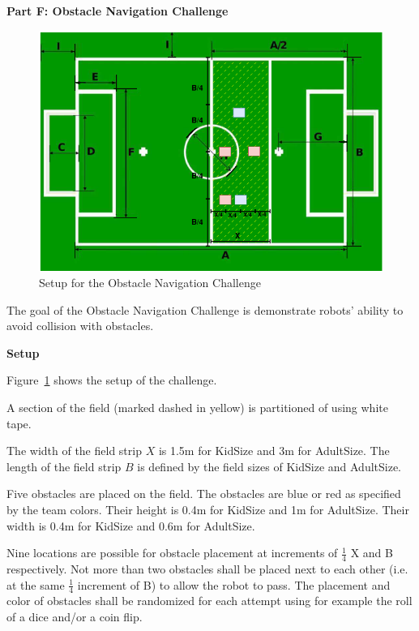 \clearpage
\sffamily
{\bfseries\color[rgb]{0.4,0.4,0.4} Part F: Obstacle Navigation Challenge}
{}

\bigskip

\begin{figure}[h!]
\centering
\includegraphics[width=\linewidth]{img/tcnavigation.png}
\caption{Setup for the Obstacle Navigation Challenge}
\label{fig:obs-nav}
\end{figure}

The goal of the Obstacle Navigation Challenge is demonstrate robots' ability to avoid collision with obstacles.

\vspace{2em}
{\bfseries Setup}

Figure~\ref{fig:obs-nav} shows the setup of the challenge.

A section of the field (marked dashed in yellow) is partitioned of using white tape.

The width of the field strip $X$ is 1.5m for KidSize and 3m for AdultSize. The length of the field strip $B$ is defined by the field sizes of KidSize and AdultSize.

Five obstacles are placed on the field. The obstacles are blue or red as specified by the team colors. Their height is 0.4m for KidSize and 1m for AdultSize. Their width is 0.4m for KidSize and 0.6m for AdultSize.

Nine locations are possible for obstacle placement at increments of $\frac{1}{4}$ X and B respectively. Not more than two obstacles shall be placed next to each other (i.e. at the same $\frac{1}{4}$ increment of B) to allow the robot to pass. The placement and color of obstacles shall be randomized for each attempt using for example the roll of a dice and/or a coin flip.

